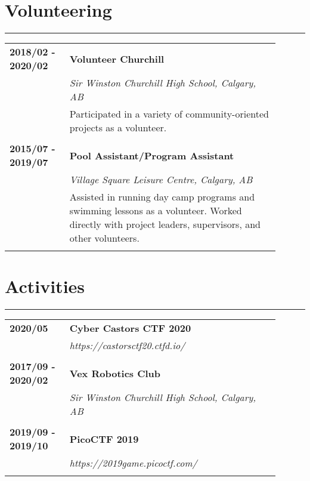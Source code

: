 \documentclass[letterpaper]{article}
\newcommand{\horizontalLine}{%
    \rule{\linewidth}{0.2pt}
    \vspace{1ex}
}
\begin{document}
    \section*{Volunteering}

        \horizontalLine

        \begin{tabular}{p{0.2\linewidth} p{0.7\linewidth}} 
            \textbf{2018/02 - 2020/02} & \large\textbf{Volunteer Churchill} \\
            & \emph{Sir Winston Churchill High School, Calgary, AB} \\
            & Participated in a variety of community-oriented projects as a volunteer. \\
            \\
            \textbf{2015/07 - 2019/07} & \large\textbf{Pool Assistant/Program Assistant} \\
            & \emph{Village Square Leisure Centre, Calgary, AB} \\
            & Assisted in running day camp programs and swimming lessons as a volunteer.
            Worked directly with project leaders, supervisors, and other volunteers. \\
            \\
        \end{tabular}

    \section*{Activities}

        \horizontalLine

        \begin{tabular}{p{0.2\linewidth} p{0.7\linewidth}} 
            \textbf{2020/05} & \large\textbf{Cyber Castors CTF 2020} \\
            & \emph{https://castorsctf20.ctfd.io/} \\
            \\
            \textbf{2017/09 - 2020/02} & \large\textbf{Vex Robotics Club} \\
            & \emph{Sir Winston Churchill High School, Calgary, AB} \\
            \\
            \textbf{2019/09 - 2019/10} & \large\textbf{PicoCTF 2019} \\
            & \emph{https://2019game.picoctf.com/} \\
            \\
        \end{tabular}
\end{document}
